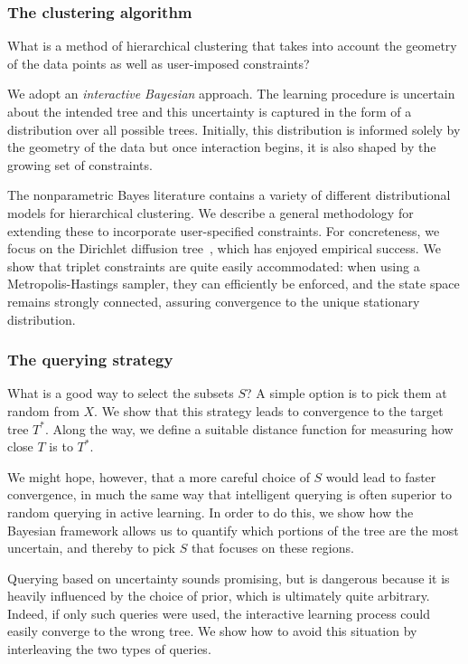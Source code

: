 \subsubsection*{The clustering algorithm}

What is a method of hierarchical clustering that takes into account the geometry of the data points as well as user-imposed constraints? 

We adopt an \emph{interactive Bayesian} approach. The learning procedure is uncertain about the intended tree and this uncertainty is captured in the form of a distribution over all possible trees. Initially, this distribution is informed solely by the geometry of the data but once interaction begins, it is also shaped by the growing set of constraints.

The nonparametric Bayes literature contains a variety of different distributional models for hierarchical clustering. We describe a general methodology for extending these to incorporate user-specified constraints. For concreteness, we focus on the Dirichlet diffusion tree~\cite{N03}, which has enjoyed empirical success. We show that triplet constraints are quite easily accommodated: when using a Metropolis-Hastings sampler, they can efficiently be enforced, and the state space remains strongly connected, assuring convergence to the unique stationary distribution.

\subsubsection*{The querying strategy}

What is a good way to select the subsets $S$? A simple option is to pick them at random from $X$. We show that this strategy leads to convergence to the target tree $T^*$. Along the way, we define a suitable distance function for measuring how close $T$ is to $T^*$. 


We might hope, however, that a more careful choice of $S$ would lead to faster convergence, in much the same way that intelligent querying is often superior to random querying in active learning. In order to do this, we show how the Bayesian framework allows us to quantify which portions of the tree are the most uncertain, and thereby to pick $S$ that focuses on these regions.

Querying based on uncertainty sounds promising, but is dangerous because it is heavily influenced by the choice of prior, which is ultimately quite arbitrary. Indeed, if only such queries were used, the interactive learning process could easily converge to the wrong tree. We show how to avoid this situation by interleaving the two types of queries.

